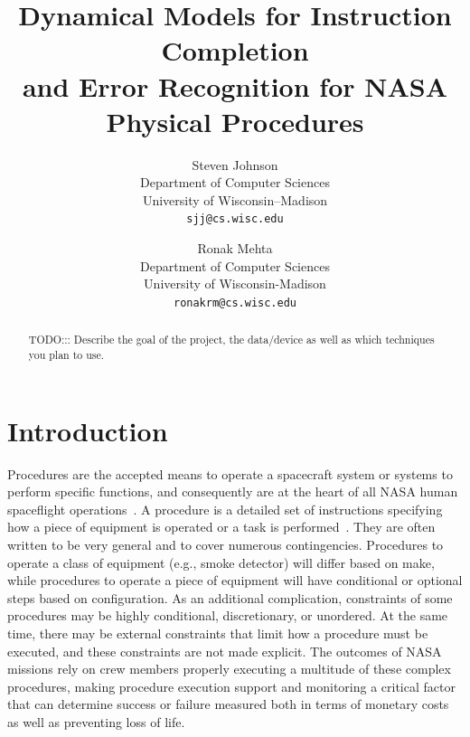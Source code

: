 \documentclass[10pt,letterpaper]{article}
\begin{document}
\title{Dynamical Models for Instruction Completion \\and Error Recognition for NASA Physical Procedures}

\author{Steven Johnson\\
Department of Computer Sciences\\
University of Wisconsin--Madison\\
{\tt\small sjj@cs.wisc.edu}

\and

Ronak Mehta\\
Department of Computer Sciences\\
University of Wisconsin-Madison\\
{\tt\small ronakrm@cs.wisc.edu}
}

\maketitle

\begin{abstract}
TODO::: Describe the goal of the project, the data/device as well as which techniques you plan to use.

\end{abstract}

\section{Introduction}

Procedures are the accepted means to operate a spacecraft system or systems to perform specific functions, and consequently are at the heart of all NASA human spaceflight operations~\cite{kortenkamp2008procedure}. A procedure is a detailed set of instructions specifying how a piece of equipment is operated or a task is performed~\cite{frank2010plans}. They are often written to be very general and to cover numerous contingencies. Procedures to operate a class of equipment (e.g., smoke detector) will differ based on make, while procedures to operate a piece of equipment will have conditional or optional steps based on configuration. As an additional complication, constraints of some procedures may be highly conditional, discretionary, or unordered. At the same time, there may be external constraints that limit how a procedure must be executed, and these constraints are not made explicit. The outcomes of NASA missions rely on crew members properly executing a multitude of these complex procedures, making procedure execution support and monitoring a critical factor that can determine success or failure measured both in terms of monetary costs as well as preventing loss of life.
\end{document}
